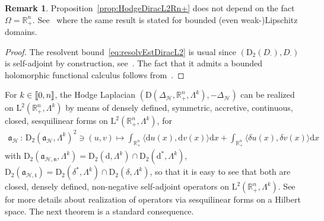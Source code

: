 \documentclass[10pt]{amsart}
\theoremstyle{definition}\newtheorem{defi}[theo]{Definition}\newtheorem{rema}[theo]{Remark}\newtheorem{exam}[theo]{Example}\newtheorem{exem}[theo]{Example}\newtheorem{nota}[theo]{Notation}
\newcommand{\bbR}{\mathbb{R}}
\newcommand{\rmd}{\mathrm{d}}
\newcommand{\rmD}{\mathrm{D}}
\newcommand{\rmL}{\mathrm{L}}
\newcommand{\clH}{\mathcal{H}}
\newcommand{\fkn}{\mathfrak{n}}
\newcommand{\fkt}{\mathfrak{t}}
\newcommand{\fka}{\mathfrak{a}}
\newcommand{\llbracket}{\mathopen{[\mkern -2.7mu[}}
\newcommand{\rrbracket}{\mathclose{]\mkern -2.7mu]}}
\newcommand{\llb}{\llbracket}
\newcommand{\rrb}{\rrbracket}
\begin{document}
\begin{rema}
Proposition~\ref{prop:HodgeDiracL2Rn+} does not depend on the fact $\Omega = \bbR^n_+$. See~\cite[Section~2]{McintoshMonniaux2018} where the same result is stated for bounded (even weak-)Lipschitz domains.
\end{rema}


\begin{proof}
The resolvent bound~\eqref{eq:resolvEstDiracL2} is usual since $(\rmD_2(D_\cdot),D_\cdot)$ is self-adjoint by construction, see~\cite[Proposition~C.4.2]{bookHaase2006}.
The fact that it admits a bounded holomorphic functional calculus follows from~\cite[Section~10]{McIntosh1986}.
\end{proof}


For $k\in\llb 0,n\rrb$, the Hodge Laplacian $(\rmD(\Delta_\clH,\bbR^n_+,\Lambda^k),-\Delta_\clH)$ can be realized on $\rmL^2(\bbR^n_+,\Lambda^k)$ by means of densely defined, symmetric, accretive, continuous, closed, sesquilinear forms on $\rmL^2(\bbR^n_+,\Lambda^k)$, for
\begin{align}\label{eq:sesqlinformLaplacianHodge}
\fka_\clH\,:\, \rmD_2\left(\fka_\clH,\Lambda^k\right)^2\ni(u,v) \longmapsto \int_{\bbR^n_+}\langle \rmd u(x), {\rmd v(x)}\rangle \rmd x + \int_{\bbR^n_+}\langle \delta u(x), {\delta v(x)}\rangle\rmd x
\end{align}
with $\rmD_2(\fka_{\clH,\fkn},\Lambda^k)= \rmD_2(\rmd,\Lambda^k)\cap\rmD_2(\rmd^\ast,\Lambda^k)$, $\rmD_2(\fka_{\clH,\fkt})= \rmD_2(\delta^\ast,\Lambda^k)\cap\rmD_2(\delta,\Lambda^k)$, so that it is easy to see that both are closed, densely defined, non-negative self-adjoint operators on $\rmL^2(\bbR^n_+,\Lambda^k)$. See~\cite[Chapter~1]{bookOuhabaz2005} for more details about realization of operators via sesquilinear forms on a Hilbert space. The next theorem is a standard consequence.
\end{document}
